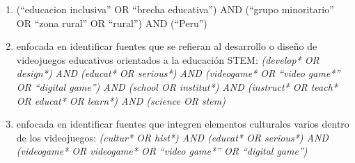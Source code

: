 \begin{enumerate}[label=\textbf{Cadena \arabic*},leftmargin=6em]
    \item (``educacion inclusiva'' OR ``brecha educativa'') AND (``grupo minoritario'' OR ``zona rural'' OR ``rural'') AND (``Peru'')
    \item enfocada en identificar fuentes que se refieran al desarrollo o diseño de videojuegos educativos orientados a la educación STEM: \textit{(develop* OR design*) AND (educat* OR serious*) AND (videogame* OR ``video game*'' OR ``digital game'') AND (school OR institut*) AND (instruct* OR teach* OR educat* OR learn*) AND (science OR stem)}
    \item enfocada en identificar fuentes que integren elementos culturales varios dentro de los videojuegos: \textit{(cultur* OR hist*) AND (educat* OR serious*) AND (videogame* OR videogame* OR ``video game*'' OR ``digital game'')}

\end{enumerate}
